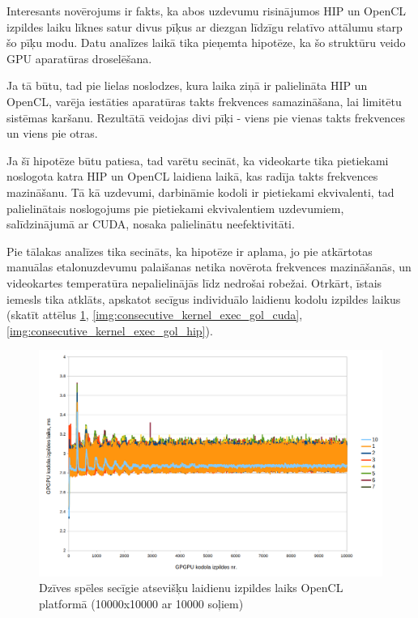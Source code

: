 Interesants novērojums ir fakts, ka abos uzdevumu risinājumos HIP un
OpenCL izpildes laiku līknes satur divus pīķus ar diezgan līdzīgu
relatīvo attālumu starp šo pīķu modu. Datu analīzes laikā tika pieņemta
hipotēze, ka šo struktūru veido GPU aparatūras droselēšana.

Ja tā būtu, tad pie lielas noslodzes, kura laika ziņā ir palielināta HIP un OpenCL, varēja
iestāties aparatūras takts frekvences samazināšana, lai limitētu sistēmas
karšanu. Rezultātā veidojas divi pīķi - viens pie vienas takts frekvences un
viens pie otras.

Ja šī hipotēze būtu patiesa, tad varētu secināt, ka videokarte tika pietiekami
noslogota katra HIP un OpenCL laidiena laikā, kas radīja takts frekvences
mazināšanu. Tā kā uzdevumi, darbināmie kodoli ir pietiekami ekvivalenti, tad
palielinātais noslogojums pie pietiekami ekvivalentiem uzdevumiem,
salīdzinājumā ar CUDA, nosaka palielinātu neefektivitāti.

Pie tālakas analīzes tika secināts, ka hipotēze ir aplama, jo pie atkārtotas
manuālas etalonuzdevumu palaišanas netika novērota frekvences mazināšanās, un
videokartes temperatūra nepalielinājās līdz nedrošai robežai. Otrkārt, īstais
iemesls tika atklāts, apskatot secīgus individuālo laidienu kodolu izpildes
laikus (skatīt attēlus \ref{img:consecutive_kernel_exec_gol_cl}, \ref{img:consecutive_kernel_exec_gol_cuda}, \ref{img:consecutive_kernel_exec_gol_hip}).

\begin{figure}[H] \centering
    \includegraphics[width=\textwidth]{images/gol_opencl_consecutive_runs_10k_by_10k_10ksteps.png}
    \caption{Dzīves spēles secīgie atsevišķu laidienu izpildes laiks OpenCL
    platformā (10000x10000 ar 10000 soļiem)}
    \label{img:consecutive_kernel_exec_gol_cl}
\end{figure}


